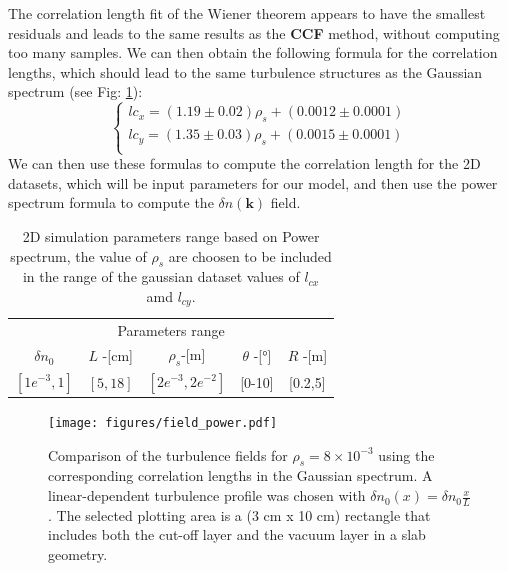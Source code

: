 \documentclass[11pt,a4paper,openany]{report}
\begin{document}
\begin{multicols}{2}
    The correlation length fit of the Wiener theorem appears to have the smallest residuals and leads to the same results as the \textbf{CCF} method, without computing too many samples. We can then obtain the following formula for the correlation lengths, which should lead to the same turbulence structures as the Gaussian spectrum (see Fig: \ref{fig:density_field}):
    \begin{equation*}
        \begin{cases}
            lc_x = (1.19 \pm 0.02) \rho_s + (0.0012 \pm 0.0001) \\
            lc_y = (1.35 \pm 0.03) \rho_s + (0.0015 \pm 0.0001) \\
        \end{cases}
        \label{eq:}
    \end{equation*}
    We can then use these formulas to compute the correlation length for the 2D datasets, which will be input parameters for our model, and then use the power spectrum formula to compute the $\delta n(\textbf{k} )$ field.

    \setlength{\tabcolsep}{.02\linewidth}

    \begin{table}[H]
        \begin{tabular}{ccccc}
            \toprule
            \multicolumn{5}{c}{Parameters range}                                         \\
            \cmidrule{1 -5}
            $\delta n_0$   & $L$ -[cm] & $\rho_s$-[m]         & $\theta$ -[°] & $R$ -[m] \\
            \midrule
            $[1e^{-3}, 1]$ & $[5,18]$  & $[2e^{-3}, 2e^{-2}]$ & [0-10]        & [0.2,5]  \\
            \bottomrule
        \end{tabular}
        \caption{2D simulation parameters range based on Power spectrum, the value of $\rho_s$ are choosen to be included in the range of the gaussian dataset values of $l_{cx}$ amd $l_{cy}$. }
        \label{Power_table}
    \end{table}


    \begin{figure}[H]
        \centering
        \texttt{[image: figures/field\_power.pdf]}
        \caption{Comparison of the turbulence fields for $\rho_s = 8 \times 10^{-3}$ using the corresponding correlation lengths in the Gaussian spectrum. A linear-dependent turbulence profile was chosen with $\delta n_0(x) = \delta n_0 \frac{x}{L}$. The selected plotting area is a (3 cm x 10 cm) rectangle that includes both the cut-off layer and the vacuum layer in a slab geometry.}
        \label{fig:density_field}
    \end{figure}


\end{multicols}
\end{document}
